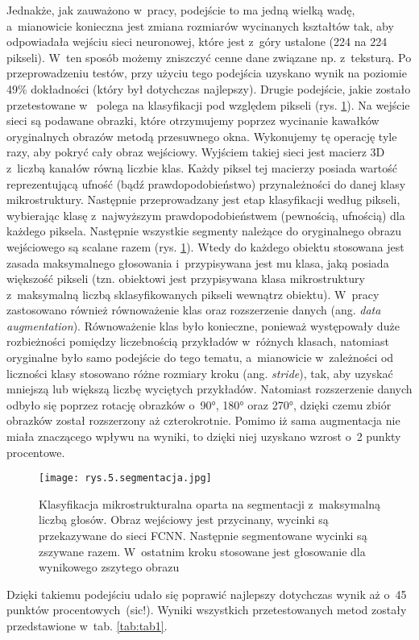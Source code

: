 Jednakże, jak zauważono w~pracy, podejście to ma jedną wielką wadę, a~mianowicie konieczna jest zmiana rozmiarów wycinanych kształtów tak, aby odpowiadała wejściu sieci neuronowej, które jest z~góry ustalone (224 na 224 pikseli). W~ten sposób możemy zniszczyć cenne dane związane np. z~teksturą. Po przeprowadzeniu testów, przy użyciu tego podejścia uzyskano wynik na poziomie 49\% dokładności (który był dotychczas najlepszy). Drugie podejście, jakie zostało przetestowane w~\cite{Azimi18} polega na klasyfikacji pod względem pikseli (rys. \ref{fig:mesh5}). Na wejście sieci są podawane obrazki, które otrzymujemy poprzez wycinanie kawałków oryginalnych obrazów metodą przesuwnego okna. Wykonujemy tę operację tyle razy, aby pokryć cały obraz wejściowy. Wyjściem takiej sieci jest macierz 3D z~liczbą kanałów równą liczbie klas. Każdy piksel tej macierzy posiada wartość reprezentującą ufność (bądź prawdopodobieństwo) przynależności do danej klasy mikrostruktury. Następnie przeprowadzany jest etap klasyfikacji według pikseli, wybierając klasę z~najwyższym prawdopodobieństwem (pewnością, ufnością) dla każdego piksela. Następnie wszystkie segmenty należące do oryginalnego obrazu wejściowego są scalane razem (rys. \ref{fig:mesh5}). Wtedy do każdego obiektu stosowana jest zasada maksymalnego głosowania i~przypisywana jest mu klasa, jaką posiada większość pikseli (tzn. obiektowi jest przypisywana klasa mikrostruktury z~maksymalną liczbą sklasyfikowanych pikseli wewnątrz obiektu). W~pracy zastosowano również równoważenie klas oraz rozszerzenie danych (ang. \textit{data augmentation}). Równoważenie klas było konieczne, ponieważ występowały duże rozbieżności pomiędzy liczebnością przykładów w~różnych klasach, natomiast oryginalne było samo podejście do tego tematu, a~mianowicie w~zależności od liczności klasy stosowano różne rozmiary kroku (ang. \textit{stride}), tak, aby uzyskać mniejszą lub większą liczbę wyciętych przykładów. Natomiast rozszerzenie danych odbyło się poprzez rotację obrazków o~90°, 180° oraz 270°, dzięki czemu zbiór obrazków został rozszerzony aż czterokrotnie. Pomimo iż sama augmentacja nie miała znaczącego wpływu na wyniki, to dzięki niej uzyskano wzrost o~2 punkty procentowe.
\begin{figure}[h]
    \centering
    \texttt{[image: rys.5.segmentacja.jpg]}
    \caption{Klasyfikacja mikrostrukturalna oparta na segmentacji z~maksymalną liczbą głosów. Obraz wejściowy jest przycinany, wycinki są przekazywane do sieci FCNN. Następnie segmentowane wycinki są zszywane razem. W~ostatnim kroku stosowane jest głosowanie dla wynikowego zszytego obrazu \cite{Azimi18}}
    \label{fig:mesh5}
\end{figure}
Dzięki takiemu podejściu udało się poprawić najlepszy dotychczas wynik aż o~45 punktów procentowych~(sic!). Wyniki wszystkich przetestowanych metod zostały przedstawione w~tab. \ref{tab:tab1}.

